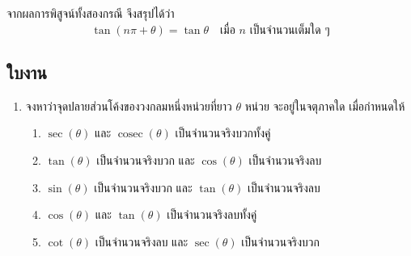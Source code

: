 \vspace{1.5em}
\noindent จากผลการพิสูจน์ทั้งสองกรณี จึงสรุปได้ว่า
$$\tan(n\pi + \theta) = \tan\theta \quad \text{เมื่อ } n \text{ เป็นจำนวนเต็มใด ๆ}$$

\newpage
\subsection*{ใบงาน}
\begin{enumerate}[label=\arabic*., leftmargin=*]
	\item จงหาว่าจุดปลายส่วนโค้งของวงกลมหนึ่งหน่วยที่ยาว $\theta$ หน่วย จะอยู่ในจตุภาคใด เมื่อกำหนดให้
	\begin{enumerate}[label=\theenumi\arabic*), leftmargin=1.5em, itemsep=0.6em]
		\everymath{\displaystyle}
		\item $\sec \left( \theta \right)$ และ $\operatorname{cosec} \left( \theta \right)$ เป็นจำนวนจริงบวกทั้งคู่
		\item $\tan \left( \theta \right)$ เป็นจำนวนจริงบวก และ $\cos \left( \theta \right)$ เป็นจำนวนจริงลบ
		\item $\sin \left( \theta \right)$ เป็นจำนวนจริงบวก และ $\tan \left( \theta \right)$ เป็นจำนวนจริงลบ
		\item $\cos \left( \theta \right)$ และ $\tan \left( \theta \right)$ เป็นจำนวนจริงลบทั้งคู่
		\item $\cot \left( \theta \right)$ เป็นจำนวนจริงลบ และ $\sec \left( \theta \right)$ เป็นจำนวนจริงบวก
	\end{enumerate}
	

\end{enumerate}
